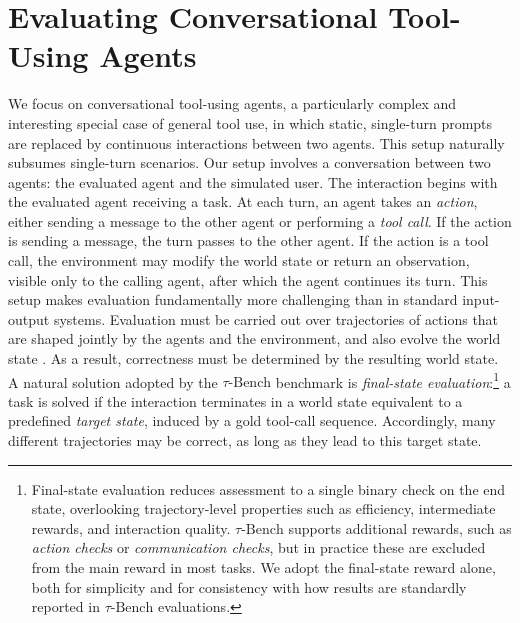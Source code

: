 \section{Evaluating Conversational Tool-Using Agents}
\label{sec:evaluation}

We focus on conversational tool-using agents, a particularly complex and interesting special case of general tool use, in which static, single-turn prompts are replaced by continuous interactions between two agents. This setup naturally subsumes single-turn scenarios.
Our setup involves a conversation between two agents: the evaluated agent and the simulated user. The interaction begins with the evaluated agent receiving a task. At each turn, an agent takes an \emph{action}, either sending a message to the other agent or performing a \emph{tool call}. If the action is sending a message, the turn passes to the other agent. If the action is a tool call, the environment may modify the world state or return an observation, visible only to the calling agent, after which the agent continues its turn. This setup makes evaluation fundamentally more challenging than in standard input-output systems. Evaluation must be carried out over trajectories of actions that are shaped jointly by the agents and the environment, and also evolve the world state \citep{yehudai2025surveyevaluationllmbasedagents}. As a result, correctness must be determined by the resulting world state. A natural solution adopted by the $\tau\text{-Bench}$ benchmark \citep{taubench_24_yao} is \emph{final-state evaluation}:\footnote{Final-state evaluation reduces assessment to a single binary check on the end state, overlooking trajectory-level properties such as efficiency, intermediate rewards, and interaction quality. $\tau\text{-Bench}$ supports additional rewards, such as \emph{action checks} or \emph{communication checks}, but in practice these are excluded from the main reward in most tasks. We adopt the final-state reward alone, both for simplicity and for consistency with how results are standardly reported in $\tau\text{-Bench}$ evaluations.} a task is solved if the interaction terminates in a world state equivalent to a predefined \emph{target state}, induced by a gold tool-call sequence. Accordingly, many different trajectories may be correct, as long as they lead to this target state.

